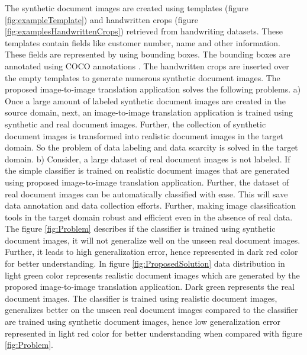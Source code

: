 The synthetic document images are created using templates (figure \ref{fig:exampleTemplate}) and handwritten crops (figure \ref{fig:examplesHandwrittenCrops}) retrieved from handwriting datasets. These templates contain fields like customer number, name and other information. These fields are represented by using bounding boxes. The bounding boxes are annotated using \ac{COCO} annotations \cite{10.1007/978-3-319-10602-1_48}. The handwritten crops are inserted over the empty templates to generate numerous synthetic document images. The proposed image-to-image translation application solves the following problems. a) Once a large amount of labeled synthetic document images are created in the source domain, next, an image-to-image translation application is trained using synthetic and real document images. Further, the collection of synthetic document images is transformed into realistic document images in the target domain. So the problem of data labeling and data scarcity is solved in the target domain. b) Consider, a large dataset of real document images is not labeled. If the simple classifier is trained on realistic document images that are generated using proposed image-to-image translation application. Further, the dataset of real document images can be automatically classified with ease. This will save data annotation and data collection efforts. Further, making image classification tools in the target domain robust and efficient even in the absence of real data. The figure \ref{fig:Problem} describes if the classifier is trained using synthetic document images, it will not generalize well on the unseen real document images. Further, it leads to high generalization error, hence represented in dark red color for better understanding. In figure \ref{fig:ProposedSolution} data distribution in light green color represents realistic document images which are generated by the proposed image-to-image translation application. Dark green represents the real document images.  The classifier is trained using realistic document images, generalizes better on the unseen real document images compared to the classifier are trained using synthetic document images, hence low generalization error represented in light red color for better understanding when compared with figure \ref{fig:Problem}.

